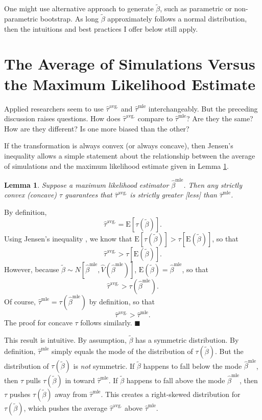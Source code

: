 \documentclass[10pt]{article}
\newtheorem{lemma}{Lemma}
\newenvironment{proof}[1][Proof]{\begin{trivlist}
\item[\hskip \labelsep {\bfseries #1}]}{\end{trivlist}}
\begin{document}
One might use alternative approach to generate $\tilde{\beta}$, such as parametric or non-parametric bootstrap. 
As long $\tilde{\beta}$ approximately follows a normal distribution, then the intuitions and best practices I offer below still apply.

\section*{The Average of Simulations Versus the Maximum Likelihood Estimate}

Applied researchers seem to use $\hat{\tau}^\text{avg.}$ and $\hat{\tau}^\text{mle}$ interchangeably. 
But the preceding discussion raises questions. How does $\hat{\tau}^{\text{avg.}}$ compare to $\hat{\tau}^{\text{mle}}$? Are they the same? How are they different? Is one more biased than the other? 

If the transformation is always convex (or always concave), then Jensen's inequality allows a simple statement about the relationship between the average of simulations and the maximum likelihood estimate given in Lemma \ref{lem:direction}.

\begin{lemma}\label{lem:direction}
Suppose a maximum likelihood estimator $\hat{\beta}^\text{mle}$. 
Then any strictly convex (concave) $\tau$ guarantees that $\hat{\tau}^{\text{avg.}}$ is strictly greater [less] than $\hat{\tau}^\text{mle}$.
\end{lemma} 
\begin{proof}
By definition, $$ \hat{\tau}^{\text{avg.}} = \text{E}\left[ \tau \left(\tilde{\beta} \right) \right].$$
Using Jensen's inequality \citep[p. 190, Thm. 4.7.7]{CasellaBerger2002}, we know that $\text{E}\left[ \tau \left(\tilde{\beta} \right) \right] > \tau \left[ \text{E}\left( \tilde{\beta} \right) \right]$, so that $$\hat{\tau}^{\text{avg.}} > \tau \left[ \text{E}\left( \tilde{\beta} \right) \right].$$ 
However, because $\tilde{\beta} \sim N \left[ \hat{\beta}^{\text{mle}}, \hat{V} \left( \hat{\beta}^{\text{mle}} \right) \right]$, $\text{E}\left( \tilde{\beta} \right) = \hat{\beta}^\text{mle}$, so that 
$$\hat{\tau}^{\text{avg.}} > \tau \left( \hat{\beta}^\text{mle}\right).$$ 
Of course, $\hat{\tau}^\text{mle} = \tau \left( {\hat{\beta}^\text{mle}} \right)$ by definition, so that $$\hat{\tau}^{\text{avg.}} > \hat{\tau}^\text{mle}.$$ 
The proof for concave $\tau$ follows similarly.
 $\blacksquare$
\end{proof}
This result is intuitive. 
By assumption, $\tilde{\beta}$ has a symmetric distribution. 
By definition, $\hat{\tau}^\text{mle}$ simply equals the mode of the distribution of $\tau(\tilde{\beta})$.  
But the distribution of $\tau(\tilde{\beta})$ is \emph{not} symmetric.
If $\tilde{\beta}$ happens to fall below the mode $\hat{\beta}^\text{mle}$, then $\tau$ pulls $\tau(\tilde{\beta})$ in toward $\hat{\tau}^\text{mle}$. 
If $\tilde{\beta}$ happens to fall above the mode $\hat{\beta}^\text{mle}$, then $\tau$ pushes $\tau(\tilde{\beta})$ away from $\hat{\tau}^\text{mle}$. 
This creates a right-skewed distribution for $\tau(\tilde{\beta})$, which pushes the average $\hat{\tau}^\text{avg.}$ above $\hat{\tau}^\text{mle}$.
\end{document}
